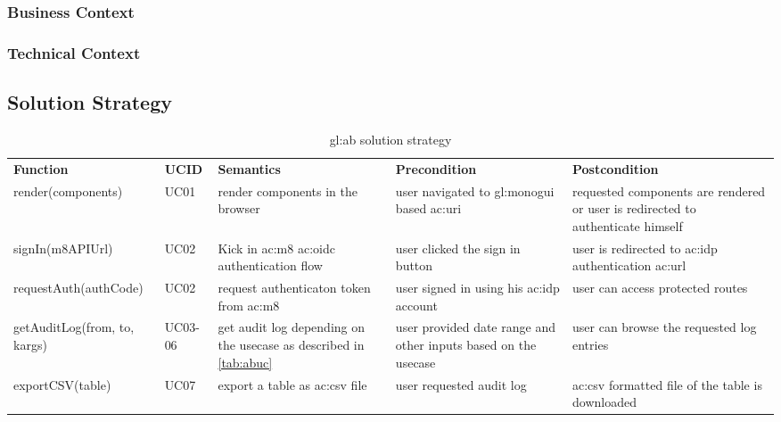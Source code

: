 \subsubsection{Business Context}


\subsubsection{Technical Context}


\subsection{Solution Strategy}

\begin{table}[H]
  \begin{center}
    \label{tab:abss}
    \def\arraystretch{1.5}
    \begin{tabularx}{\linewidth}{| X l X X X |}
      \hline
      \rowcolor{gray!20}
      \textbf{Function} & \textbf{UCID} & \textbf{Semantics} & \textbf{Precondition} & \textbf{Postcondition}\\

      render(\-components) & UC01 & render components in the browser & user navigated to \gls{gl:monogui} based \gls{ac:uri} & requested components are rendered or user is redirected to authenticate himself \\

      signIn(\-m8APIUrl) & UC02 & Kick in \gls{ac:m8} \gls{ac:oidc} authentication flow & user clicked the sign in button & user is redirected to \gls{ac:idp} authentication \gls{ac:url} \\

      requestAuth(\-authCode) & UC02 & request authenticaton token from \gls{ac:m8} & user signed in using his \gls{ac:idp} account & user can access protected routes \\

      getAuditLog(\-from, to, kargs) & UC03-06 & get audit log depending on the usecase as described in \ref{tab:abuc} & user provided date range and other inputs based on the usecase & user can browse the requested log entries \\

      exportCSV(table) & UC07 & export a table as \gls{ac:csv} file & user requested audit log & \gls{ac:csv} formatted file of the table is downloaded \\

      \hline
    \end{tabularx}
  \end{center}
  \caption{\Gls{gl:ab} solution strategy}
\end{table}

